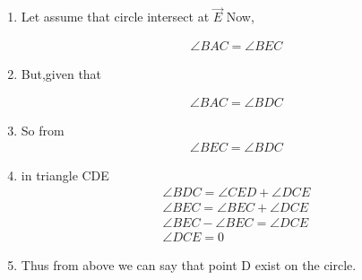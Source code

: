 \begin{enumerate}[label=\thesection.\arabic*.,ref=\thesection.\theenumi]

%
\item Let assume that  circle intersect at $\vec{E}$
Now,

\begin{align}
\angle{BAC} = \angle{BEC}%
\end{align}

\item But,given that 

\begin{align}
\angle{BAC} = \angle{BDC}
\end{align}
\item So from 
\begin{align}
\angle{BEC} = \angle{BDC}
\end{align}

\item in triangle CDE
\begin{align}
\angle{BDC} = \angle{CED} + \angle{DCE}
\\
\angle{BEC} = \angle{BEC} + \angle{DCE}
\\
\angle{BEC} - \angle{BEC} = \angle{DCE}
\\
 \angle{DCE} = 0
\end{align}
\item Thus from above we can say that point D exist on the circle.






\end{enumerate}

